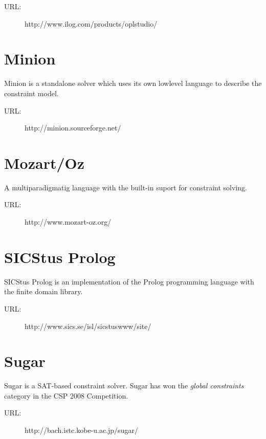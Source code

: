 \begin{description}
	\item[URL:] http://www.ilog.com/products/oplstudio/
\end{description}

\section*{Minion}
Minion is a standalone solver which uses its own lowlevel language to describe the
constraint model. 

\begin{description}
	\item[URL:] http://minion.sourceforge.net/
\end{description}  

\section*{Mozart/Oz}
A multiparadigmatig language with the built-in suport for constraint solving.

\begin{description}
	\item[URL:] http://www.mozart-oz.org/
\end{description}  

\section*{SICStus Prolog}
SICStus Prolog is an implementation of the Prolog programming language with the 
finite domain library.

\begin{description}
	\item[URL:] http://www.sics.se/isl/sicstuswww/site/
\end{description}  

\section*{Sugar}
Sugar is a SAT-based constraint solver. Sugar has won the {\em global constraints} category
in the CSP 2008 Competition.

\begin{description}
	\item[URL:] http://bach.istc.kobe-u.ac.jp/sugar/
\end{description}  
